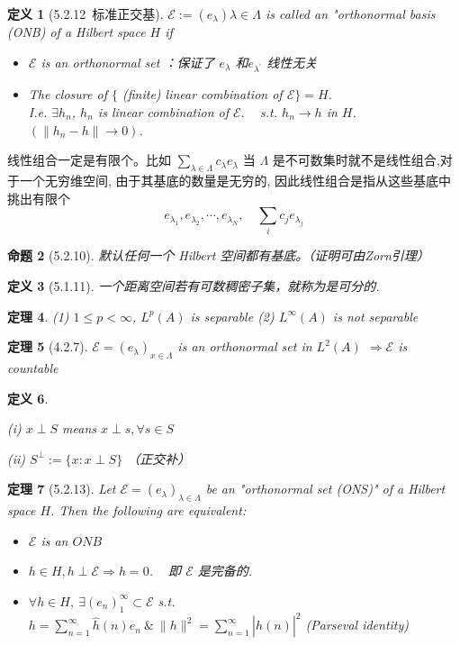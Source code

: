 \documentclass[10pt,openany]{book}
\theoremstyle{thmstyle} %
\newtheorem{theorem}{定理}[chapter]
\theoremstyle{defstyle} %
\newtheorem{definition}[theorem]{定义}
\theoremstyle{prostyle} %
\newtheorem{proposition}[theorem]{命题}
\begin{document}
\begin{definition}[5.2.12~标准正交基] 
$\mathscr{E} := \left(e_\lambda\right) \lambda \in \Lambda$ is called an "orthonormal basis (ONB) of a Hilbert space $H$ if
\begin{itemize}
  \item $\mathscr{E}$ is an orthonormal set ：保证了 $e_\lambda$ 和$e_{\lambda^{\prime}}$ 线性无关
  \item The closure of $\{$ (finite) linear combination of $\mathscr{E}\}=H$. \\
    I.e. $\exists h_n $, $ h_n $ is linear combination of $\mathscr{E}$. ~ s.t. $h_n \rightarrow h$ in $H$. $\left(\| h_n-h \| \rightarrow 0\right)$.
\end{itemize}
\end{definition}

线性组合一定是有限个。比如 $\sum_{\lambda \in \Lambda} c_\lambda e_\lambda$ 当 $\Lambda$ 是不可数集时就不是线性组合,对于一个无穷维空间, 由于其基底的数量是无穷的, 因此线性组合是指从这些基底中挑出有限个
$$
e_{\lambda_1}, e_{\lambda_2}, \cdots, e_{\lambda_N}, \quad \sum_i c_j e_{\lambda_j}
$$


\begin{proposition}[5.2.10]
默认任何一个 Hilbert 空间都有基底。（证明可由Zorn引理）
\end{proposition}

\begin{definition}[5.1.11]
一个距离空间若有可数稠密子集，就称为是可分的.
\end{definition}

\begin{theorem}
(1) $1 \leqslant p<\infty$,  $L^p(A)$ is separable
(2) $L^\infty(A)$ is not separable
\end{theorem}

\begin{theorem}[4.2.7]
$ \mathscr{E}=\left(e_\lambda\right)_{x \in \Lambda}$ is an orthonormal set in $L^2(A)$ $\Rightarrow \mathscr{E}$ is countable
\end{theorem}

\begin{definition} \

(i) $x \perp S$ means $x \perp s, \forall s \in S$

(ii) $S^{\perp}:=\{x: x \perp S\}$ （正交补）
\end{definition}

\begin{theorem}[5.2.13]
Let $\mathscr{E}=\left(e_\lambda\right)_{\lambda \in \Lambda}$ be an "orthonormal set (ONS)" of a Hilbert space $H$. Then the following are equivalent:
\begin{itemize}
  \item $\mathscr{E}$ is an $O N B$
  \item $h \in H, h \perp \mathscr{E} \Rightarrow h=0$. ~ 即 $\mathscr{E}$ 是完备的.
  \item $\forall h \in H, ~ \exists\left(e_n\right)_1^\infty \subset \mathscr{E}$ s.t. ~ $h=\sum_{n=1}^{\infty} \hat{h}(n) e_n ~ \& ~ \|h\|^2=\sum_{n=1}^{\infty}|\hat{h}(n)|^2$ (Parseval identity)
\end{itemize}
\end{theorem}
\end{document}
